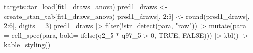 \documentclass[
  11pt,
  letterpaper,
  DIV=11,
  numbers=noendperiod]{scrartcl}
\newenvironment{Shaded}{}{}
\newcommand{\AttributeTok}[1]{\textcolor[rgb]{0.84,0.23,0.29}{#1}}
\newcommand{\ConstantTok}[1]{\textcolor[rgb]{0.00,0.36,0.77}{#1}}
\newcommand{\DecValTok}[1]{\textcolor[rgb]{0.00,0.36,0.77}{#1}}
\newcommand{\FunctionTok}[1]{\textcolor[rgb]{0.44,0.26,0.76}{#1}}
\newcommand{\NormalTok}[1]{\textcolor[rgb]{0.14,0.16,0.18}{#1}}
\newcommand{\OtherTok}[1]{\textcolor[rgb]{0.44,0.26,0.76}{#1}}
\newcommand{\SpecialCharTok}[1]{\textcolor[rgb]{0.00,0.36,0.77}{#1}}
\newcommand{\StringTok}[1]{\textcolor[rgb]{0.01,0.18,0.38}{#1}}
\begin{document}
\begin{Shaded}
\begin{Highlighting}[]
\NormalTok{targets}\SpecialCharTok{::}\FunctionTok{tar\_load}\NormalTok{(fit1\_draws\_anova)}
\NormalTok{pred1\_draws }\OtherTok{\textless{}{-}} \FunctionTok{create\_stan\_tab}\NormalTok{(fit1\_draws\_anova)}
\NormalTok{pred1\_draws[, }\DecValTok{2}\SpecialCharTok{:}\DecValTok{6}\NormalTok{] }\OtherTok{\textless{}{-}} \FunctionTok{round}\NormalTok{(pred1\_draws[, }\DecValTok{2}\SpecialCharTok{:}\DecValTok{6}\NormalTok{], }\AttributeTok{digits =} \DecValTok{3}\NormalTok{)}
\NormalTok{pred1\_draws }\SpecialCharTok{|\textgreater{}}
  \FunctionTok{filter}\NormalTok{(}\SpecialCharTok{!}\FunctionTok{str\_detect}\NormalTok{(para, }\StringTok{"raw"}\NormalTok{)) }\SpecialCharTok{|\textgreater{}}
  \FunctionTok{mutate}\NormalTok{(}\AttributeTok{para =} \FunctionTok{cell\_spec}\NormalTok{(para, }\AttributeTok{bold=} \FunctionTok{ifelse}\NormalTok{(q2\_5 }\SpecialCharTok{*}\NormalTok{ q97\_5 }\SpecialCharTok{\textgreater{}} \DecValTok{0}\NormalTok{, }\ConstantTok{TRUE}\NormalTok{, }\ConstantTok{FALSE}\NormalTok{))) }\SpecialCharTok{|\textgreater{}}
  \FunctionTok{kbl}\NormalTok{() }\SpecialCharTok{|\textgreater{}}
  \FunctionTok{kable\_styling}\NormalTok{()}
\end{Highlighting}
\end{Shaded}
\end{document}
